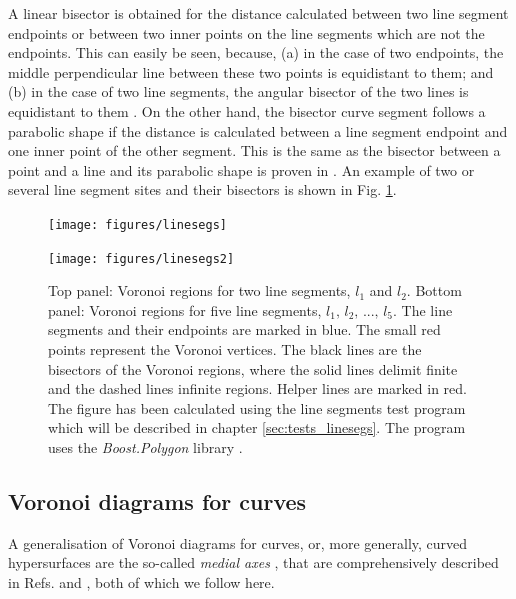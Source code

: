 A linear bisector is obtained for the distance calculated between two line segment endpoints or between two inner 
points on the line segments which are not the endpoints.
This can easily be seen, because, (a) in the case of two endpoints, the middle perpendicular line between these 
two points is equidistant to them; and (b) in the case of two line segments, the angular bisector of the two lines is
equidistant to them \cite[pp. 243-244]{FUH_geo2020}.
On the other hand, the bisector curve segment follows a parabolic shape if the distance is calculated 
between a line segment endpoint and one inner point of the other segment. This is the same as the bisector between
a point and a line and its parabolic shape is proven in \cite[pp. 260-261]{FUH_geo2020}.
An example of two or several line segment sites and their bisectors is shown in Fig. \ref{fig:linesegs_voro}.

\begin{figure}[H]
	\begin{minipage}{1 \textwidth}
		\begin{center}
			\texttt{[image: figures/linesegs]}
		\end{center}
		\vspace{0.5cm}
	\end{minipage}
	\begin{minipage}{1 \textwidth}
		\vspace{0.25cm}
		\begin{center}
			\texttt{[image: figures/linesegs2]}
		\end{center}
	\end{minipage}
	\caption[Voronoi diagrams for line segments.]{
		Top panel: Voronoi regions for two line segments, $l_1$ and $l_2$.
		Bottom panel: Voronoi regions for five line segments, $l_1,\, l_2,\, ...,\, l_5$.
		The line segments and their endpoints are marked in blue. The small red points represent the Voronoi vertices.
		The black lines are the bisectors of the Voronoi regions, where the solid lines delimit finite and the dashed lines
		infinite regions. Helper lines are marked in red. The figure has been calculated using the line segments
		test program which will be described in chapter \ref{sec:tests_linesegs}. The program uses 
		the \textit{Boost.Polygon} library \cite{web_boost_polygon_voronoi}.
		\label{fig:linesegs_voro}}
\end{figure}




\subsection{Voronoi diagrams for curves}
\label{sec:voro_median}
A generalisation of Voronoi diagrams for curves, or, more generally, curved hypersurfaces are the so-called 
\textit{medial axes} \cite{wiki_medial}, that are comprehensively described in 
Refs. \cite[pp. 109-114]{Boissonnat2006} and \cite[pp. 244-252]{Cazals2006}, both of which we follow here.

